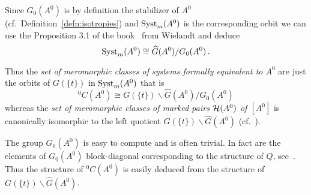 \begin{lem}
  Since $G_0(A^0)$ is by definition the stabilizer of $A^0$ (cf.\
  Definition~\ref{defn:isotropies}) and $\operatorname{Syst}_m(A^0)$ is the corresponding
  orbit we can use the Proposition 3.1 of the
  book~\cite{wielandt1964finite} from Wielandt and deduce
  \[
    \operatorname{Syst}_m(A^0)\cong \widehat G(A^0)/G_0(A^0) \,.
  \]
  \begin{s-cor}\label{cor:isomorphyOfClassfset}
    Thus the \emph{set of meromorphic classes of systems formally equivalent
    to $A^0$} are just the orbits of $G(\!\{t\}\!)$ in $\operatorname{Syst}_m(A^0)$ that is
    \[
      {}^0C(A^0)\cong G(\!\{t\}\!)\backslash\hat G(A^0)/G_0(A^0)
    \]
    whereas the \emph{set of meromorphic classes of marked pairs $\mathcal{H}(A^0)$
    of $[A^0]$} is canonically isomorphic to the left quotient
    $G(\!\{t\}\!)\backslash\hat G(A^0)$ (cf.\ \cite[Lem.1.17]{thboalch}).
  \end{s-cor}
\end{lem}
The group $G_0(A^0)$ is easy to compute and is often trivial. In fact are the
elements of $G_0(A^0)$ block-diagonal corresponding to the structure of $Q$,
see~\cite[77]{Loday2014}.
Thus the structure of ${}^0C(A^0)$ is easily deduced from the structure of
$G(\!\{t\}\!)\backslash\hat G(A^0)$.

